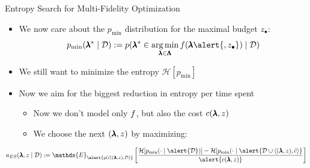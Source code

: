 \begin{frame}[c]{Entropy Search for Multi-Fidelity Optimization }

\begin{itemize}
		\item We now care about the $p_{\text{min}}$ distribution for the maximal budget $z_{\bullet}$:
		$$p_{\text{min}}(\conf^* \mid \dataset) := p(\conf^* \in \argmin_{\conf\in \pcs} \func(\conf\alert{,z_{\bullet}}) \mid \dataset)$$
	
		\item We still want to minimize the entropy $\mathcal{H}[p_\text{min}]$
\pause
\medskip
		\item Now we aim for the biggest \alert{reduction in entropy per time spent}
		\begin{itemize}
			\item Now we don't model only $f$, but also \alert{the cost $c(\pmb{\lambda},z)$}
			\item We choose the next $(\pmb{\lambda},z)$ by maximizing:
		\end{itemize}
\end{itemize}
\vspace*{0.5cm}
	\[{\acq}_{ES}(\conf,z \mid \dataset) := \mathds{E}_{\alert{p(\tilde{\cost}\mid (\conf, z), \dataset)}} 
	\left[   \frac{\mathcal{H}[p_{\text{min}}(\cdot \mid \alert{\dataset})] - \mathcal{H}[p_{\text{min}}(\cdot \mid \alert{\dataset \cup \left\langle (\conf,z), \tilde{\cost} \right\rangle}}{\alert{c(\conf,z)}} \right]\]


\end{frame}

